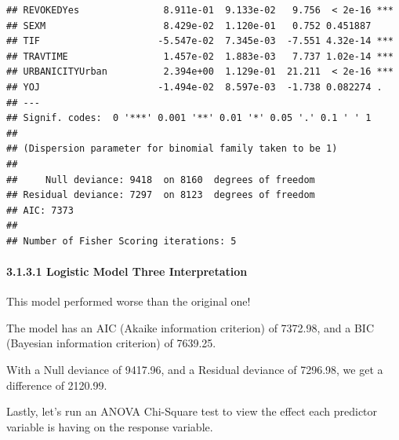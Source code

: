 \documentclass[]{article}
\let\oldparagraph\paragraph
\renewcommand{\paragraph}[1]{\oldparagraph{#1}\mbox{}}
\begin{document}
\begin{verbatim}
## REVOKEDYes               8.911e-01  9.133e-02   9.756  < 2e-16 ***
## SEXM                     8.429e-02  1.120e-01   0.752 0.451887    
## TIF                     -5.547e-02  7.345e-03  -7.551 4.32e-14 ***
## TRAVTIME                 1.457e-02  1.883e-03   7.737 1.02e-14 ***
## URBANICITYUrban          2.394e+00  1.129e-01  21.211  < 2e-16 ***
## YOJ                     -1.494e-02  8.597e-03  -1.738 0.082274 .  
## ---
## Signif. codes:  0 '***' 0.001 '**' 0.01 '*' 0.05 '.' 0.1 ' ' 1
## 
## (Dispersion parameter for binomial family taken to be 1)
## 
##     Null deviance: 9418  on 8160  degrees of freedom
## Residual deviance: 7297  on 8123  degrees of freedom
## AIC: 7373
## 
## Number of Fisher Scoring iterations: 5
\end{verbatim}

\paragraph{3.1.3.1 Logistic Model Three
Interpretation}\label{logistic-model-three-interpretation}

This model performed worse than the original one!

The model has an AIC (Akaike information criterion) of 7372.98, and a
BIC (Bayesian information criterion) of 7639.25.

With a Null deviance of 9417.96, and a Residual deviance of 7296.98, we
get a difference of 2120.99.

Lastly, let's run an ANOVA Chi-Square test to view the effect each
predictor variable is having on the response variable.
\end{document}
